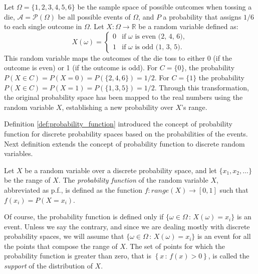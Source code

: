 \begin{example}
\label{ex:probability_distribution_real_line}
Let $\Omega = \{1, 2, 3, 4, 5, 6\}$ be the sample space of possible outcomes when tossing a die, $\mathcal{A} = \mathcal{P} \left( \Omega \right)$ be all possible events of $\Omega$, and $P$ a probability that assigns $1/6$ to each single outcome in $\Omega$. Let $X: \Omega \rightarrow \mathbb{R}$ be a random variable defined as:
    \[
    X(\omega) = 
    \begin{cases} 
      0 & \text{if } \omega \text{ is even (2, 4, 6)}, \\
      1 & \text{if } \omega \text{ is odd (1, 3, 5)}.
    \end{cases}
    \]
This random variable maps the outcomes of the die toss to either 0 (if the outcome is even) or 1 (if the outcome is odd). For $C = \{0\}$, the probability $P(X \in C) = P(X = 0) = P(\{2, 4, 6\}) = 1/2$. For $C = \{1\}$ the probability $P(X \in C) = P(X = 1) = P(\{1, 3, 5\}) = 1/2$. Through this transformation, the original probability space has been mapped to the real numbers using the random variable $X$, establishing a new probability over $X$'s range.
\end{example}

Definition \ref{def:probability_function} introduced the concept of probability function for discrete probability spaces based on the probabilities of the events. Next definition extends the concept of probability function to discrete random variables.

\begin{definition}
Let $X$ be a random variable over a discrete probability space, and let $\{ x_1, x_2, \ldots \}$ be the range of $X$. The \emph{probability function} of the random variable $X$, abbreviated as p.f., is defined as the function $f : range \left( X \right) \rightarrow [0, 1]$ such that $f \left( x_i \right) = P \left( X = x_i \right)$.
\end{definition}

Of course, the probability function is defined only if $\{ \omega \in \Omega \,:\, X \left( \omega \right) = x_i\}$ is an event. Unless we say the contrary, and since we are dealing mostly with discrete probability spaces, we will assume that $\{ \omega \in \Omega \,:\, X \left( \omega \right) = x_i\}$ is an event for all the points that compose the range of $X$. The set of points for which the probability function is greater than zero, that is $\left\{ x \, : \, f \left( x \right) > 0 \right\}$, is called the \emph{support} of the distribution of $X$.

